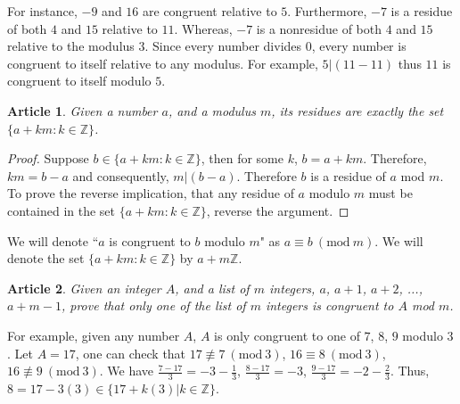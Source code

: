 \documentclass{article}
\theoremstyle{problemstyle}
\newtheorem{article}{Article}
\newcommand{\Mod}[1]{\ (\mathrm{mod}\ #1)}
\begin{document}
For instance, $-9$ and $16$ are congruent relative to $5$. Furthermore, $-7$ is a residue of both $4$ and $15$ relative to $11$. Whereas, $-7$ is a nonresidue of both $4$ and $15$ relative to the modulus $3$.  Since every number divides $0$, every number is congruent to itself relative to any modulus. For example, $5|(11-11)$ thus $11$ is congruent to itself modulo $5$.  

\begin{article}
Given a number $a$, and a modulus $m$, its residues are exactly the set $\{a + km : k \in \mathbb{Z}\}$.
\end{article}

\begin{proof}
Suppose $b \in \{a + km : k \in \mathbb{Z}\}$, then for some $k$, $b = a +km$. Therefore, $km = b-a$ and consequently, $m|(b-a)$. Therefore $b$ is a residue of $a$ mod $m$. To prove the reverse implication, that any residue of $a$ modulo $m$ must be contained in the set $\{a + km : k \in \mathbb{Z}\}$, reverse the argument. 
\end{proof}

We will denote ``$a$ is congruent to $b$ modulo $m$" as $a \equiv b \Mod{m}$. We will denote the set $\{a + km : k \in \mathbb{Z}\}$ by $a+m\mathbb{Z}$. 

\begin{article}
Given an integer $A$, and a list of $m$ integers, $a$, $a+1$, $a+2$, ..., $a+m-1$, prove that only one of the list of $m$ integers is congruent to $A$ mod $m$. 
\end{article}

For example, given any number $A$, $A$ is only congruent to one of $7$, $8$, $9$ modulo $3$. Let $A = 17$, one can check that $17 \not\equiv 7 \Mod{3}$, $16 \equiv 8 \Mod{3}$, $16 \not\equiv 9 \Mod{3}$. We have $\frac{7-17}{3} = -3-\frac{1}{3}$, $\frac{8-17}{3} = -3$, $\frac{9-17}{3} = -2-\frac{2}{3}$. Thus, $8 = 17-3(3) \in \{17+k(3)|k \in \mathbb{Z}\}$. 
\end{document}
